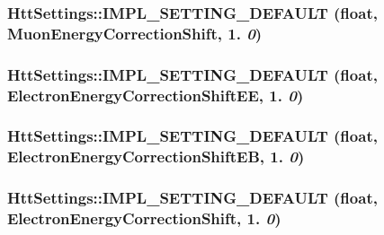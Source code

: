 \label{classHttSettings_a678dfd913c2204cc5d642301a43756fa}
\hypertarget{classHttSettings_a26c1338e64e048cec7d543ca9ccbf72c}{
\subsubsection[{IMPL\_\-SETTING\_\-DEFAULT}]{\setlength{\rightskip}{0pt plus 5cm}HttSettings::IMPL\_\-SETTING\_\-DEFAULT (float, \/  MuonEnergyCorrectionShift, \/  1. {\em 0})}}
\label{classHttSettings_a26c1338e64e048cec7d543ca9ccbf72c}
\hypertarget{classHttSettings_a57dc3006dca1a95598947f28502475cc}{
\subsubsection[{IMPL\_\-SETTING\_\-DEFAULT}]{\setlength{\rightskip}{0pt plus 5cm}HttSettings::IMPL\_\-SETTING\_\-DEFAULT (float, \/  ElectronEnergyCorrectionShiftEE, \/  1. {\em 0})}}
\label{classHttSettings_a57dc3006dca1a95598947f28502475cc}
\hypertarget{classHttSettings_ad23f95a86a7e9281e084669b4293d5d7}{
\subsubsection[{IMPL\_\-SETTING\_\-DEFAULT}]{\setlength{\rightskip}{0pt plus 5cm}HttSettings::IMPL\_\-SETTING\_\-DEFAULT (float, \/  ElectronEnergyCorrectionShiftEB, \/  1. {\em 0})}}
\label{classHttSettings_ad23f95a86a7e9281e084669b4293d5d7}
\hypertarget{classHttSettings_a6f23d8103aaea6cdfe90ca7b79ce94a9}{
\subsubsection[{IMPL\_\-SETTING\_\-DEFAULT}]{\setlength{\rightskip}{0pt plus 5cm}HttSettings::IMPL\_\-SETTING\_\-DEFAULT (float, \/  ElectronEnergyCorrectionShift, \/  1. {\em 0})}}
\label{classHttSettings_a6f23d8103aaea6cdfe90ca7b79ce94a9}
